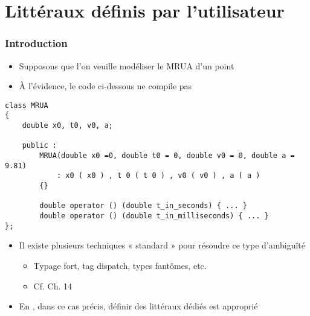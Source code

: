 \section{Littéraux définis par l'utilisateur}

\begin{frame}[containsverbatim]
\frametitle{Introduction}
\begin{itemize}
\item Supposons que l'on veuille modéliser le MRUA d'un point
\item À l'évidence, le code ci-dessous ne compile pas
\end{itemize}
\begin{lstlisting}
class MRUA
{
	double x0, t0, v0, a;
	
	public :
		MRUA(double x0 =0, double t0 = 0, double v0 = 0, double a = 9.81)
			: x0 ( x0 ) , t 0 ( t 0 ) , v0 ( v0 ) , a ( a )
		{}
		
		double operator () (double t_in_seconds) { ... }
		double operator () (double t_in_milliseconds) { ... }
};
\end{lstlisting}
\begin{itemize}
\item Il existe plusieurs techniques « standard » pour résoudre ce type d'ambiguïté
	\begin{itemize}
	\item Typage fort, tag dispatch, types fantômes, etc.
	\item Cf. Ch. 14
	\end{itemize}
\item En \cpp, dans ce cas précis, définir des littéraux dédiés est approprié
\end{itemize}
\end{frame}

